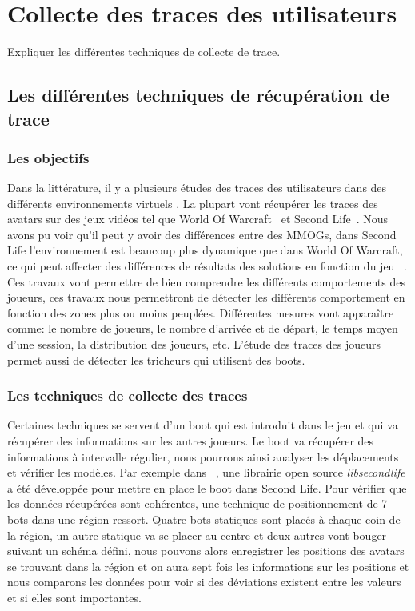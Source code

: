 \newpage
\section{Collecte des traces des utilisateurs}
	\label{trace}
	Expliquer les différentes techniques de collecte de trace.
	\subsection{Les différentes techniques de récupération de trace}
		\subsubsection{Les objectifs}
		Dans la littérature, il y a plusieurs études des traces des utilisateurs dans des différents environnements virtuels \cite{1326262,0295-5075-88-4-48007}. La plupart vont récupérer les traces des avatars sur des jeux vidéos tel que World Of Warcraft~\cite{wow} et Second Life~\cite{sl}. Nous avons pu voir qu'il peut y avoir des différences entre des MMOGs, dans Second Life l'environnement est beaucoup plus dynamique que dans World Of Warcraft, ce qui peut affecter des différences de résultats des solutions en fonction du jeu ~\cite{DBLP:journals/corr/abs-0807-2328,1613041}. Ces travaux vont permettre de bien comprendre les différents comportements des joueurs, ces travaux nous permettront de détecter les différents comportement en fonction des zones plus ou moins peuplées. Différentes mesures vont apparaître comme: le nombre de joueurs, le nombre d'arrivée et de départ, le temps moyen d'une session, la distribution des joueurs, etc. L'étude des traces des joueurs permet aussi de détecter les tricheurs qui utilisent des boots. \\
		\subsubsection{Les techniques de collecte des traces}
	Certaines techniques se servent d'un boot qui est introduit dans le jeu et qui va récupérer des informations sur les autres joueurs. Le boot va récupérer des informations à intervalle régulier, nous pourrons ainsi analyser les déplacements et vérifier les modèles. Par exemple dans ~\cite{DBLP:journals/corr/abs-0807-2328}, une librairie open source \textit{libsecondlife} a été développée pour mettre en place le boot dans Second Life. Pour vérifier que les données récupérées sont cohérentes, une technique de positionnement de 7 bots dans une région ressort. Quatre bots statiques sont placés à chaque coin de la région, un autre statique va se placer au centre et deux autres vont bouger suivant un schéma défini, nous pouvons alors enregistrer les positions des avatars se trouvant dans la région et on aura sept fois les informations sur les positions et nous comparons les données pour voir si des déviations existent entre les valeurs et si elles sont importantes.\\  

